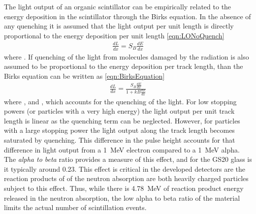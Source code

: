 The light output of an organic scintillator can be empirically related to the energy deposition in the scintillator through the Birks equation.
In the absence of any quenching it is assumed that the light output per unit length is directly proportional to the energy deposition per unit length \eqref{eqn:LONoQuench}
\begin{align}
  \label{eqn:LONoQuench}
    \frac{dL}{dx} = S_B\frac{dE}{dx}
\end{align}
where .
If quenching of the light from molecules damaged by the radiation is also assumed to be proportional to the energy deposition per track length, than the Birks equation can be written as \eqref{eqn:BirksEquation}
\begin{align}
  \label{eqn:BirksEquation}
    \frac{dL}{dx} = \frac{S_B\frac{dE}{dx}}{1+kB\frac{dE}{dx}}
    \end{align}
    where , and , which accounts for the quenching of the light.
For low stopping powers (or particles with a very high energy) the light output per unit track length is linear as the quenching term can be neglected.
However, for particles with a large stopping power the light output along the track length becomes saturated by quenching.
This difference in the pulse height accounts for that difference in light output from a \SI{1}{\MeV} electron compared to a \SI{1}{\MeV} alpha.
The \textit{alpha to beta} ratio provides a measure of this effect, and for the GS20 glass is it typically around 0.23.
This effect is critical in the developed detectors are the reaction products of of the  neutron absorption are both heavily charged particles subject to this effect.
Thus, while there is \SI{4.78}{\MeV} of reaction product energy released in the neutron absorption, the low alpha to beta ratio of the material limits the actual number of scintillation events.

